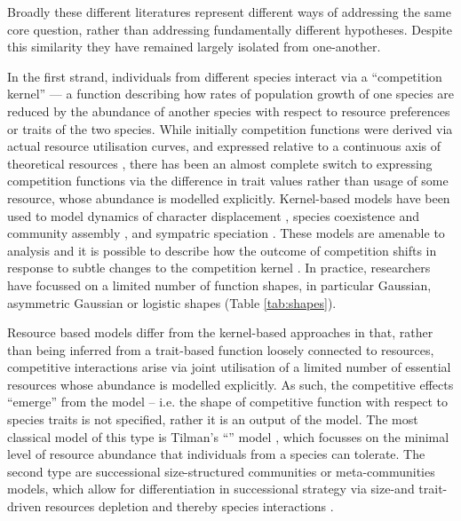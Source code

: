 \documentclass[a4paper,11pt]{article}
\begin{document}
Broadly these different literatures represent different ways of
addressing the same core question, rather than addressing fundamentally
different hypotheses.  Despite this similarity they have remained
largely isolated from one-another.

In the first strand, individuals from different species interact via a
``competition kernel'' --- a function describing how rates of
population growth of one species are reduced by the abundance of
another species with respect to resource preferences or traits of the
two species.
%
While initially competition functions were derived via actual resource
utilisation curves, and expressed relative to a continuous axis of theoretical resources
\citep{MacArthur-1967, Roughgarden-1979}, there has been an almost
complete switch to expressing competition functions via the
difference in trait values rather than usage of some resource, whose
abundance is modelled explicitly.
%
Kernel-based models have been used to model dynamics of
character displacement \citep{Taper-1985, Case-2000}, species
coexistence and community assembly \citep{MacArthur-1967,
  Calcagno-2006, Leimar-2013}, and sympatric speciation
\citep{Dieckmann-1999}.
%
These models are amenable to analysis and it is possible to describe how
the outcome of competition shifts in response to subtle changes to the competition
kernel \citep{Calcagno-2006, Scheffer-2006, Pigolotti-2007,
  Leimar-2013}.
%
In practice, researchers have focussed on a limited number of function
shapes, in particular Gaussian, asymmetric Gaussian or logistic shapes
(Table \ref{tab:shapes}).

Resource based models differ from the kernel-based approaches in that,
rather than being inferred from a trait-based function loosely connected to resources, competitive
interactions arise via joint utilisation of
a limited number of essential resources whose abundance is modelled
explicitly.  As such, the competitive effects ``emerge'' from the
model -- i.e. the shape of competitive function with respect to
species traits is not specified, rather it is an output of the model.
%
The most classical model of this type is Tilman's ``\Rstar'' model \citep{Tilman-1977,
  Tilman-1982}, which focusses on the minimal level of resource
abundance that individuals from a species can tolerate.
The second type are successional size-structured communities or
meta-communities models, which allow for
differentiation in successional strategy via size-and
trait-driven resources depletion and thereby species interactions 
\citep{Huston-1987,Kohyama-1993,Moorcroft-2001,Falster-2011}.
\end{document}
